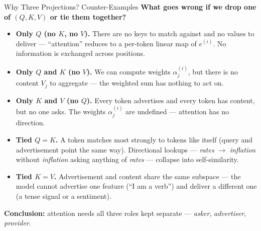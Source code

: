 \documentclass[10pt,english,aspectratio=169]{beamer}
\begin{document}
\begin{frame}{Why Three Projections? Counter-Examples}
\textbf{What goes wrong if we drop one of $(Q, K, V)$ or tie them together?}

\medskip
\begin{itemize}
\item \textbf{Only $Q$ (no $K$, no $V$).} There are no keys to match against and no values to deliver --- ``attention'' reduces to a per-token linear map of $e^{(i)}$. No information is exchanged across positions.

\medskip
\item \textbf{Only $Q$ and $K$ (no $V$).} We can compute weights $\alpha_{j}^{(i)}$, but there is no content $V_{j}$ to aggregate --- the weighted sum has nothing to act on.

\medskip
\item \textbf{Only $K$ and $V$ (no $Q$).} Every token advertises and every token has content, but no one asks. The weights $\alpha_{j}^{(i)}$ are undefined --- attention has no direction.

\medskip
\item \textbf{Tied $Q = K$.} A token matches most strongly to tokens like itself (query and advertisement point the same way). Directional lookups --- \emph{rates} $\to$ \emph{inflation} without \emph{inflation} asking anything of \emph{rates} --- collapse into self-similarity.

\medskip
\item \textbf{Tied $K = V$.} Advertisement and content share the same subspace --- the model cannot advertise one feature (``I am a verb'') and deliver a different one (a tense signal or a sentiment).
\end{itemize}

\medskip
\textbf{Conclusion:} attention needs all three roles kept separate --- \emph{asker}, \emph{advertiser}, \emph{provider}.
\end{frame}
\end{document}
